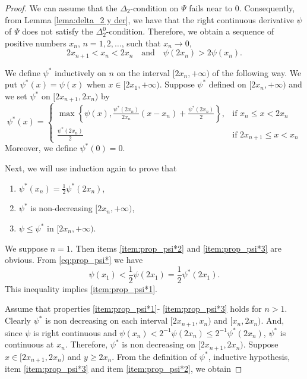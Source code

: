 \documentclass[twoside]{article}
\theoremstyle{remark}
\renewcommand{\leq}{\leqslant}
\renewcommand{\geq}{\geqslant}
\begin{document}
\begin{proof} We can assume that the $\Delta_2$-condition on $\Psi$ fails near to $0$. Consequently, from Lemma \ref{lema:delta_2 y der}, we have that the right continuous derivative $\psi$ of $\Psi$ does not satisfy the $\Delta_2^0$-condition. 
Therefore, we obtain a sequence of positive numbers $x_n$, $n=1,2,\ldots$,  such that $x_n\to 0$, 
\begin{equation}\label{eq:prop_psi*}2x_{n+1}<x_n<2x_n\quad\text{and}\quad \psi(2x_n)> 2\psi(x_n).
 \end{equation}

We define $\psi^*$ inductively on $n$ on the interval $[2x_n,+\infty)$ of the following way.   
We put $\psi^*(x)=\psi(x)$ when  $x\in[ 2x_1,+\infty)$. 
Suppose $\psi^*$ defined on $[2x_n,+\infty)$ and we set $\psi^*$ on $[2x_{n+1},2x_n)$ by
\[
 \psi^*(x)=\left\{
\begin{array}{cc}
  \max\left\{\psi(x),\frac{\psi^*(2x_n)}{2x_n}(x-x_n)+\frac{ \psi^*(2x_n)}{2}\right\},& \text{if } x_n\leq x<2x_n\\
   \frac{\psi^*(2x_n)}{2}& \text{if }2x_{n+1} \leq x<x_n
  \end{array}
\right.
\]
Moreover, we define $\psi^*(0)=0$. 


Next, we will use induction again  to prove that
\begin{enumerate}
 \item\label{item:prop_psi*1} $\psi^*(x_n)=\frac12\psi^*(2x_n)$,
 \item\label{item:prop_psi*2}  $\psi^*$ is non-decreasing $[2x_{n},+\infty)$,
 \item\label{item:prop_psi*3}   $\psi\leq \psi^*$ in  $[2x_{n},+\infty)$.
\end{enumerate}

We suppose $n=1$. Then items \ref{item:prop_psi*2} and \ref{item:prop_psi*3} are obvious. From \eqref{eq:prop_psi*} we have
\[\psi(x_1)<\frac12\psi(2x_1)=\frac12\psi^*(2x_1).\]
This inequality implies \ref{item:prop_psi*1}.

Assume that properties \ref{item:prop_psi*1}- \ref{item:prop_psi*3} holds for $n>1$.  Clearly $\psi^*$ is non decreasing on each interval $[2x_{n+1},x_n)$ and $[x_n,2x_n)$. And, since $\psi$ is right continuous and $\psi(x_n)<2^{-1}\psi(2x_n)\leq 2^{-1}\psi^*(2x_n)$, $\psi^*$ is continuous at $x_n$. Therefore, $\psi^*$ is non decreasing on $[2x_{n+1},2x_n)$. Suppose $x\in[2x_{n+1},2x_n)$ and $y\geq 2x_n$.  From the definition of $\psi^*$, inductive hypothesis, item \ref{item:prop_psi*3} and item \ref{item:prop_psi*2}, we obtain


\end{proof}
\end{document}
